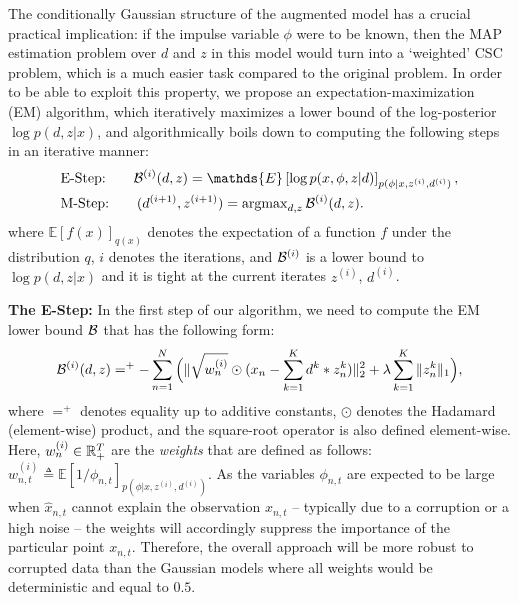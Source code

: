 The conditionally Gaussian structure of the augmented model has a crucial practical implication: if the impulse variable $\phi$ were to be known, then the MAP estimation problem over $d$ and $z$ in this model would turn into a `weighted' CSC problem, which is a much easier task compared to the original problem. In order to be able to exploit this property, we propose an expectation-maximization (EM) algorithm, which iteratively maximizes a lower bound of the log-posterior $\log p(d,z|x)$, and algorithmically boils down to computing the following steps in an iterative manner:
\begin{align}
&\text{E-Step:} \hspace{20pt} {\cal B}^{(i)}(d,z) = \mathds{E}\left[\log p(x,\phi,z|d)\right]_{p(\phi|x,z^{(i)},d^{(i)})}, \\
&\text{M-Step:} \hspace{20pt} (d^{(i+1)}, z^{(i+1)}) = \argmax\nolimits_{d,z} {\cal B}^{(i)}(d,z). \label{eq:mstep}
\end{align}
where $\mathds{E}[f(x)]_{q(x)}$ denotes the expectation of a function $f$ under the distribution $q$, $i$ denotes the iterations, and ${\cal B}^{(i)}$ is a lower bound to $\log p(d,z|x)$ and it is tight at the current iterates $z^{(i)}$, $d^{(i)}$.



%

%

\textbf{The E-Step:} 
In the first step of our algorithm, we need to compute the EM lower bound ${\cal B}$ that has the following form:
\begin{align}
{\cal B}^{(i)}(d,z) =^+ - \sum_{n=1}^N \Big( \|\sqrt{w_{n}^{(i)}} \odot (x_{n} - \sum_{k=1}^{K}d^{k} * z_{n}^{k})\|_{2}^{2} + \lambda \sum_{k=1}^K{\|z_{n}^{k}\|_1}\Big),
\end{align}
where $=^+$ denotes equality up to additive constants, $\odot$ denotes the Hadamard (element-wise) product, and the square-root operator is also defined element-wise. Here, $w_{n}^{(i)} \in \mathbb{R}^T_+$ are the \emph{weights} that are defined as follows: $w_{n,t}^{(i)} \triangleq \mathds{E}\left[1/{\phi_{n,t}}\right]_{p(\phi|x,z^{(i)},d^{(i)})}$. As the variables $\phi_{n,t}$ are expected to be large when $\hat{x}_{n,t}$ cannot explain the observation $x_{n,t}$ -- typically due to a corruption or a high noise -- the weights will accordingly suppress the importance of the particular point $x_{n,t}$. Therefore, the overall approach will be more robust to corrupted data than the Gaussian models where all weights would be deterministic and equal to $0.5$. 

